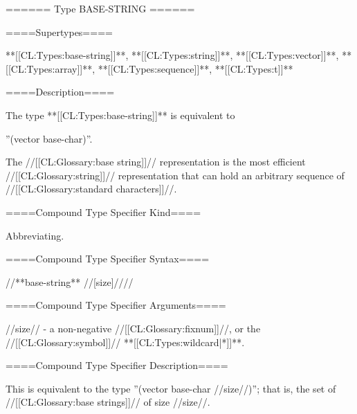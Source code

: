 ====== Type BASE-STRING ======

====Supertypes====

**[[CL:Types:base-string]]**, **[[CL:Types:string]]**, **[[CL:Types:vector]]**, **[[CL:Types:array]]**, **[[CL:Types:sequence]]**, **[[CL:Types:t]]**

====Description====

The type **[[CL:Types:base-string]]** is equivalent to

''(vector base-char)''.

The //[[CL:Glossary:base string]]// representation is the most efficient //[[CL:Glossary:string]]// representation that can hold an arbitrary sequence of //[[CL:Glossary:standard characters]]//.

====Compound Type Specifier Kind====

Abbreviating.

====Compound Type Specifier Syntax====

//**base-string** //[size]////

====Compound Type Specifier Arguments====

//size// - a non-negative //[[CL:Glossary:fixnum]]//, or the //[[CL:Glossary:symbol]]// **[[CL:Types:wildcard|*]]**.

====Compound Type Specifier Description====

This is equivalent to the type ''(vector base-char //size//)''; that is, the set of //[[CL:Glossary:base strings]]// of size //size//.

   
